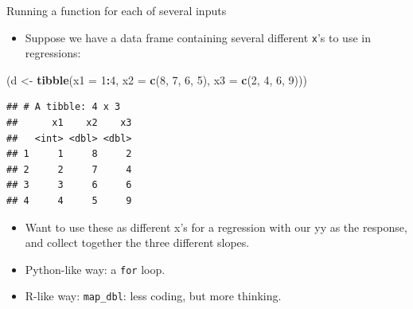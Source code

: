 \documentclass[ignorenonframetext,]{beamer}
\newenvironment{Shaded}{\begin{snugshade}}{\end{snugshade}}
\newcommand{\DataTypeTok}[1]{\textcolor[rgb]{0.13,0.29,0.53}{#1}}
\newcommand{\DecValTok}[1]{\textcolor[rgb]{0.00,0.00,0.81}{#1}}
\newcommand{\KeywordTok}[1]{\textcolor[rgb]{0.13,0.29,0.53}{\textbf{#1}}}
\newcommand{\NormalTok}[1]{#1}
\newcommand{\OperatorTok}[1]{\textcolor[rgb]{0.81,0.36,0.00}{\textbf{#1}}}
\newcommand{\StringTok}[1]{\textcolor[rgb]{0.31,0.60,0.02}{#1}}
\providecommand{\tightlist}{%
  \setlength{\itemsep}{0pt}\setlength{\parskip}{0pt}}
\begin{document}
\begin{frame}[fragile]{Running a function for each of several inputs}
\protect\hypertarget{running-a-function-for-each-of-several-inputs}{}

\begin{itemize}
\tightlist
\item
  Suppose we have a data frame containing several different \texttt{x}'s
  to use in regressions:
\end{itemize}

\begin{Shaded}
\begin{Highlighting}[]
\NormalTok{(d <-}\StringTok{ }\KeywordTok{tibble}\NormalTok{(}\DataTypeTok{x1 =} \DecValTok{1}\OperatorTok{:}\DecValTok{4}\NormalTok{, }\DataTypeTok{x2 =} \KeywordTok{c}\NormalTok{(}\DecValTok{8}\NormalTok{, }\DecValTok{7}\NormalTok{, }\DecValTok{6}\NormalTok{, }\DecValTok{5}\NormalTok{), }\DataTypeTok{x3 =} \KeywordTok{c}\NormalTok{(}\DecValTok{2}\NormalTok{, }\DecValTok{4}\NormalTok{, }\DecValTok{6}\NormalTok{, }\DecValTok{9}\NormalTok{)))}
\end{Highlighting}
\end{Shaded}

\begin{verbatim}
## # A tibble: 4 x 3
##      x1    x2    x3
##   <int> <dbl> <dbl>
## 1     1     8     2
## 2     2     7     4
## 3     3     6     6
## 4     4     5     9
\end{verbatim}

\begin{itemize}
\tightlist
\item
  Want to use these as different x's for a regression with our yy as the
  response, and collect together the three different slopes.
\item
  Python-like way: a \texttt{for} loop.
\item
  R-like way: \texttt{map\_dbl}: less coding, but more thinking.
\end{itemize}

\end{frame}
\end{document}
